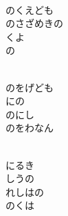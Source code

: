 \documentclass[10pt,b5j]{tarticle} %
\begin{document}
\begin{enumerate}
\begin{minipage}[c]{\blocksize}
    \end{minipage}
    \begin{minipage}[c]{\blocksize}
        
        \vspace{\linespace}
        \item~\\
        のくえども\\
        のさざめきの\\
        くよ\\
        の
        
    \end{minipage}
    \begin{minipage}[c]{\blocksize}
        
        \vspace{\linespace}
        \item~\\
        のをげども\\
        にの\\
        のにし\\
        のをわなん
        
    \end{minipage}
    \begin{minipage}[c]{\blocksize}
        
        \vspace{\linespace}
        \item~\\
        にるき\\
        しうの\\
        れしはの\\
        のくは
    
    \end{minipage}
\end{enumerate} %
\end{document}
